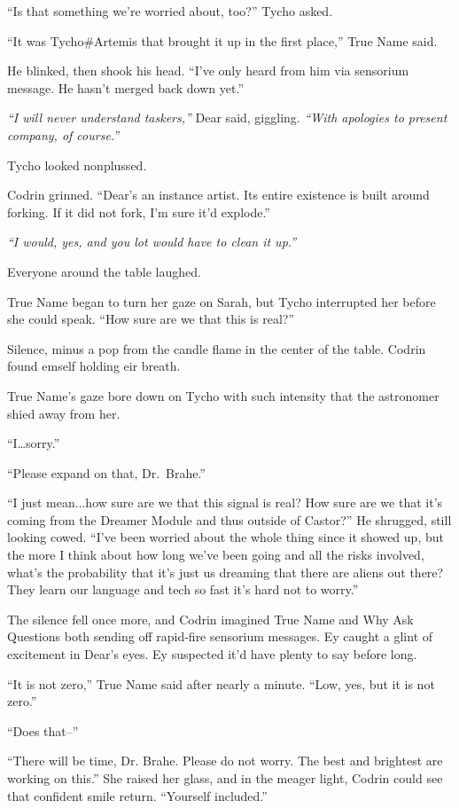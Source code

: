 ``Is that something we're worried about, too?'' Tycho asked.

``It was Tycho\#Artemis that brought it up in the first place,'' True Name said.

He blinked, then shook his head. ``I've only heard from him via sensorium message. He hasn't merged back down yet.''

\emph{``I will never understand taskers,''} Dear said, giggling. \emph{``With apologies to present company, of course.''}

Tycho looked nonplussed.

Codrin grinned. ``Dear's an instance artist. Its entire existence is built around forking. If it did not fork, I'm sure it'd explode.''

\emph{``I would, yes, and you lot would have to clean it up.''}

Everyone around the table laughed.

True Name began to turn her gaze on Sarah, but Tycho interrupted her before she could speak. ``How sure are we that this is real?''

Silence, minus a pop from the candle flame in the center of the table. Codrin found emself holding eir breath.

True Name's gaze bore down on Tycho with such intensity that the astronomer shied away from her.

``I\ldots{}sorry.''

``Please expand on that, Dr.~Brahe.''

``I just mean...how sure are we that this signal is real? How sure are we that it's coming from the Dreamer Module and thus outside of Castor?'' He shrugged, still looking cowed. ``I've been worried about the whole thing since it showed up, but the more I think about how long we've been going and all the risks involved, what's the probability that it's just us dreaming that there are aliens out there? They learn our language and tech so fast it's hard not to worry.''

The silence fell once more, and Codrin imagined True Name and Why Ask Questions both sending off rapid-fire sensorium messages. Ey caught a glint of excitement in Dear's eyes. Ey suspected it'd have plenty to say before long.

``It is not zero,'' True Name said after nearly a minute. ``Low, yes, but it is not zero.''

``Does that--''

``There will be time, Dr. Brahe. Please do not worry. The best and brightest are working on this.'' She raised her glass, and in the meager light, Codrin could see that confident smile return. ``Yourself included.''

